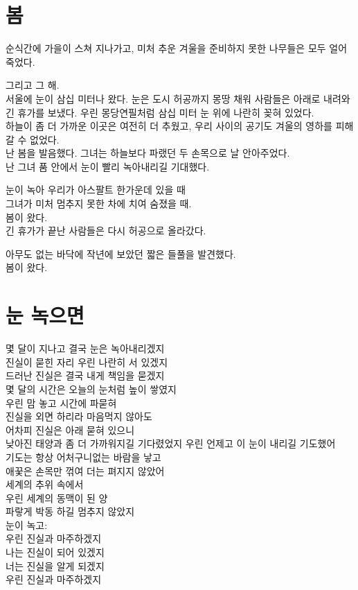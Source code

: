 \documentclass[12pt, b6paper, openany]{memoir}
\newenvironment{lyric}{\setlength{\parindent}{0pt}}{}
\begin{document}
\begin{lyric}
\hypertarget{uxbd04}{%
\chapter{봄}\label{uxbd04}}

순식간에 가을이 스쳐 지나가고, 미처 추운 겨울을 준비하지 못한 나무들은 모두 얼어 죽었다.

그리고 그 해.\\
서울에 눈이 삼십 미터나 왔다. 눈은 도시 허공까지 몽땅 채워 사람들은 아래로 내려와 긴 휴가를 보냈다. 우린 몽당연필처럼 삼십 미터 눈 위에 나란히 꽂혀 있었다.\\
하늘이 좀 더 가까운 이곳은 여전히 더 추웠고, 우리 사이의 공기도 겨울의 영하를 피해갈 수 없었다.\\
난 봄을 발음했다. 그녀는 하늘보다 파랬던 두 손목으로 날 안아주었다.\\
난 그녀 품 안에서 눈이 빨리 녹아내리길 기대했다.

눈이 녹아 우리가 아스팔트 한가운데 있을 때\\
그녀가 미처 멈추지 못한 차에 치여 숨졌을 때.\\
봄이 왔다.\\
긴 휴가가 끝난 사람들은 다시 허공으로 올라갔다.

아무도 없는 바닥에 작년에 보았던 짧은 들풀을 발견했다.\\
봄이 왔다.
\end{lyric}

\begin{lyric}
\hypertarget{uxb208-uxb179uxc73cuxba74}{%
\chapter{눈 녹으면}\label{uxb208-uxb179uxc73cuxba74}}

몇 달이 지나고 결국 눈은 녹아내리겠지\\
진실이 묻힌 자리 우린 나란히 서 있겠지\\
드러난 진실은 결국 내게 책임을 묻겠지\\
몇 달의 시간은 오늘의 눈처럼 높이 쌓였지\\
우린 맘 놓고 시간에 파묻혀\\
진실을 외면 하리라 마음먹지 않아도\\
어차피 진실은 아래 묻혀 있으니\\
낮아진 태양과 좀 더 가까워지길 기다렸었지 우린 언제고 이 눈이 내리길 기도했어\\
기도는 항상 어처구니없는 바람을 낳고\\
애꿎은 손목만 꺾여 더는 펴지지 않았어\\
세계의 추위 속에서\\
우린 세계의 동맥이 된 양\\
파랗게 박동 하길 멈추지 않았지\\
눈이 녹고:\\
우린 진실과 마주하겠지\\
나는 진실이 되어 있겠지\\
너는 진실을 알게 되겠지\\
우린 진실과 마주하겠지
\end{lyric}
\end{document}
